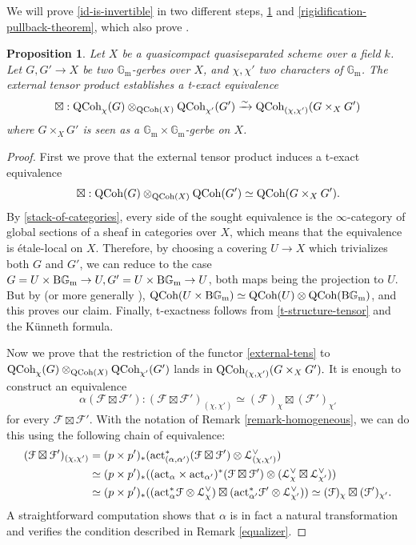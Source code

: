 \documentclass[11pt, twoside]{article} %
\numberwithin{equation}{section}
\theoremstyle{plain}
\newtheorem{prop}[thm]{Proposition}
\theoremstyle{definition}
\newcommand{\act}{\textup{act}}
\newcommand{\Gm}{\mathbb G_{\mathrm{m}}}
\newcommand{\QCoh}{\textup{QCoh}}
\newcommand{\BGm}{\textup{B}\Gm}
\newcommand{\cF}{{\mathcal F}}
\newcommand{\cL}{\mathcal L}
\begin{document}
	We will prove \cref{id-is-invertible} in two different steps, \cref{external-product-theorem} and \cref{rigidification-pullback-theorem}, which also prove \cite[Conjecture 5.27]{BP}.

	
	\begin{prop}\label{external-product-theorem}Let $X$ be a quasicompact quasiseparated scheme over a field $k$.	Let $G,G'\to X$ be two $\Gm$-gerbes over $X$, and $\chi, \chi'$ two characters of $\Gm$. The external tensor product establishes a t-exact equivalence $$\boxtimes: \QCoh_\chi(G)\otimes_{\QCoh(X)}\QCoh_{\chi'}(G')\xrightarrow{\sim}\QCoh_{(\chi,\chi')}(G\times_XG')$$ where $G\times_XG'$ is seen as a $\Gm\times \Gm$-gerbe on $X$.
	\end{prop}
	\begin{proof}

		First we prove that the external tensor product induces a t-exact equivalence \begin{equation}\label{external-tens}\boxtimes:\QCoh(G)\otimes_{\QCoh(X)}\QCoh(G')\simeq \QCoh(G\times_XG').\end{equation} By \cref{stack-of-categories}, every side of the sought equivalence is the $\infty$-category of global sections of a sheaf in categories over $X$, which means that the equivalence is \'etale-local on $X$. Therefore, by choosing a covering $U\to X$ which trivializes both $G$ and $G'$, we can reduce to the case $G=U\times \BGm\to U, G'=U \times \BGm\to U$, both maps being the projection to $U$. But by \cite[Corollary 5.4]{BP} (or more generally \cite[Corollary 9.4.2.4]{SAG}), $\QCoh(U\times \BGm)\simeq \QCoh(U)\otimes \QCoh(\BGm)$, and this proves our claim. Finally, t-exactness follows from \cref{t-structure-tensor} and the K\"unneth formula.
		
		
		Now we prove that the restriction of the functor \eqref{external-tens} to $\QCoh_\chi(G)\otimes_{\QCoh(X)}\QCoh_{\chi'}(G')$ lands in $\QCoh_{(\chi, \chi')}(G\times_X G').$ It is enough to construct an equivalence
		$$ \alpha(\cF\boxtimes \cF'): (\cF\boxtimes \cF')_{(\chi,\chi')} \simeq (\cF)_\chi\boxtimes (\cF')_{\chi'}$$
		for every $\cF \boxtimes \cF'$. With the notation of Remark \ref{remark-homogeneous}, we can do this using the following chain of equivalence:
		\begin{equation*}
		\begin{split}
		(\cF\boxtimes \cF')_{(\chi,\chi')} &=(p\times p')_*(\act^*_{(\alpha,\alpha')}(\cF\boxtimes\cF')\otimes \cL_{(\chi,\chi')}^\vee) \\ & \simeq (p\times p')_*((\act_{\alpha}\times\act_{\alpha'})^*(\cF\boxtimes\cF')\otimes (\cL_{\chi}^\vee\boxtimes\cL_{\chi'}^\vee))\\ &\simeq (p\times p')_*((\act^*_{\alpha}\cF\otimes \cL_{\chi}^\vee)\boxtimes(\act_{\alpha'}^*\cF'\otimes \cL_{\chi'}^\vee))\simeq (\cF)_\chi\boxtimes (\cF')_{\chi'}.
		\end{split}
	    \end{equation*}
		A straightforward computation shows that $\alpha$ is in fact a natural transformation and verifies the condition described in Remark \cref{equalizer}. 
	

\end{proof}
\end{document}
